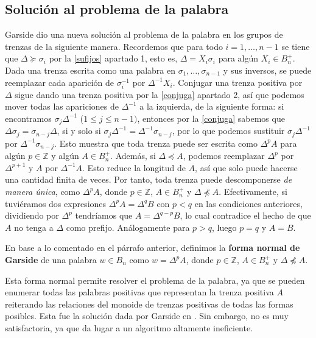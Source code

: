 \documentclass[bibtex, anon]{TEMat-article}
\newcommand{\Z}{\mathbb{Z}}
\begin{document}
\subsection{Solución al problema de la palabra}

Garside dio una nueva solución al problema de la palabra en los grupos de trenzas de la siguiente manera. Recordemos que para todo $i=1,\dots, n-1$ se tiene que $\Delta\succcurlyeq\sigma_i$ por la \cref{sufijos} apartado 1, esto es, $\Delta=X_i\sigma_i$ para algún $X_i\in B_n^+$. Dada una trenza escrita como una palabra en $\sigma_1,\dots,\sigma_{n-1}$ y sus inversos, se puede reemplazar cada aparición de $\sigma_i^{-1}$ por $\Delta^{-1}X_i$. Conjugar una trenza positiva por $\Delta$ sigue dando una trenza positiva por la \cref{conjuga} apartado 2, así que podemos mover todas las apariciones de $\Delta^{-1}$ a la izquierda, de la siguiente forma: si encontramos $\sigma_j\Delta^{-1}$ ($1\leq j\leq n-1)$, entonces por la \cref{conjuga} sabemos que $\Delta\sigma_{j}=\sigma_{n-j}\Delta$, si y solo si  $\sigma_j\Delta^{-1}=\Delta^{-1}\sigma_{n-j}$, por lo que podemos sustituir $\sigma_j\Delta^{-1}$ por $\Delta^{-1}\sigma_{n-j}$. Esto muestra que toda trenza puede ser escrita como $\Delta^p A$ para algún $p\in\Z$ y algún $A\in B_n^+$. Además, si $\Delta\preccurlyeq A$, podemos reemplazar $\Delta^p$ por $\Delta^{p+1}$ y $A$ por $\Delta^{-1}A$. Esto reduce la longitud de $A$, así que solo puede hacerse una cantidad finita de veces. Por tanto, toda trenza puede descomponerse \emph{de manera única}, como $\Delta^pA$, donde $p\in\Z$, $A\in B_n^+$ y $\Delta\not\preccurlyeq A$. Efectivamente, si tuviéramos dos expresiones $\Delta^pA=\Delta^q B$ con $p<q$ en las condiciones anteriores, dividiendo por $\Delta^p$ tendríamos que $A=\Delta^{q-p}B$, lo cual contradice el hecho de que $A$ no tenga a $\Delta$ como prefijo. Análogamente para $p>q$, luego $p=q$ y $A=B$.

\begin{definicion}
	En base a lo comentado en el párrafo anterior, definimos la \textbf{forma normal de Garside} de una palabra $w\in B_n$ como $w=\Delta^pA$, donde $p\in\Z$, $A\in B_n^+$ y $\Delta\not\preccurlyeq A$. 
\end{definicion}

Esta forma normal permite resolver el problema de la palabra, ya que se pueden enumerar todas las palabras positivas que representan la trenza positiva $A$ reiterando las relaciones del monoide de trenzas positivas de todas las formas posibles. Esta fue la solución dada por Garside en \cite{Garside}. Sin embargo, no es muy satisfactoria, ya que da lugar a un algoritmo altamente ineficiente.
\end{document}
